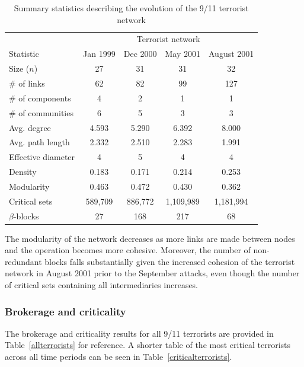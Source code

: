 \begin{table}[h]
\begin{center}
\begin{tabular}{lcccc}
\toprule
& \multicolumn{4}{c}{Terrorist network} \\[1ex]
Statistic	& Jan 1999 & Dec 2000 & May 2001 & August 2001 \\
\midrule
Size ($n$)  & 27	& 31	& 31 & 32	 \\ 
\# of links & 62 & 82 & 99 & 127 \\
\# of components	& 4 & 2 & 1 & 1 \\
\# of communities & 6 & 5 & 3 & 3 \\
Avg. degree  & 4.593  & 5.290 & 6.392 & 8.000 \\
Avg. path length & 2.332	 & 2.510 & 2.283 & 1.991 \\
Effective diameter & 4 & 5 & 4 & 4 \\
Density & 0.183 & 0.171 & 0.214 & 0.253 \\
Modularity  & 0.463  & 0.472 & 0.430 & 0.362 \\
Critical sets  & 589,709 & 886,772 & 1,109,989 & 1,181,994	\\
$\beta$-blocks & 27 & 168 & 217 & 68 \\
\bottomrule
\end{tabular}
\end{center}
\caption{Summary statistics describing the evolution of the 9/11 terrorist network}
\label{TerroristSS}
\end{table}

The modularity of the network decreases as more links are made between nodes and the operation becomes more cohesive. Moreover, the number of non-redundant blocks falls substantially given the increased cohesion of the terrorist network in August 2001 prior to the September attacks, even though the number of critical sets containing all intermediaries increases.

\subsubsection*{Brokerage and criticality}

The brokerage and criticality results for all 9/11 terrorists are provided in Table~\ref{allterrorists} for reference. A shorter table of the most critical terrorists across all time periods can be seen in Table~\ref{criticalterrorists}.

